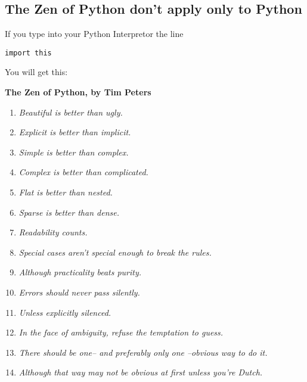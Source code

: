\documentclass[letterpaper,10pt,english]{manual}
\begin{document}
\subsection{The Zen of Python don't apply only to Python}

If you type into your Python Interpretor the line

\begin{Verbatim}[commandchars=\\\{\}]
import this
\end{Verbatim}

You will get this:

\textbf{The Zen of Python, by Tim Peters}
\begin{enumerate}
\item {} 
\emph{Beautiful is better than ugly.}

\item {} 
\emph{Explicit is better than implicit.}

\item {} 
\emph{Simple is better than complex.}

\item {} 
\emph{Complex is better than complicated.}

\item {} 
\emph{Flat is better than nested.}

\item {} 
\emph{Sparse is better than dense.}

\item {} 
\emph{Readability counts.}

\item {} 
\emph{Special cases aren't special enough to break the rules.}

\item {} 
\emph{Although practicality beats purity.}

\item {} 
\emph{Errors should never pass silently.}

\item {} 
\emph{Unless explicitly silenced.}

\item {} 
\emph{In the face of ambiguity, refuse the temptation to guess.}

\item {} 
\emph{There should be one-- and preferably only one --obvious way to do it.}

\item {} 
\emph{Although that way may not be obvious at first unless you're Dutch.}


\end{enumerate}
\end{document}
